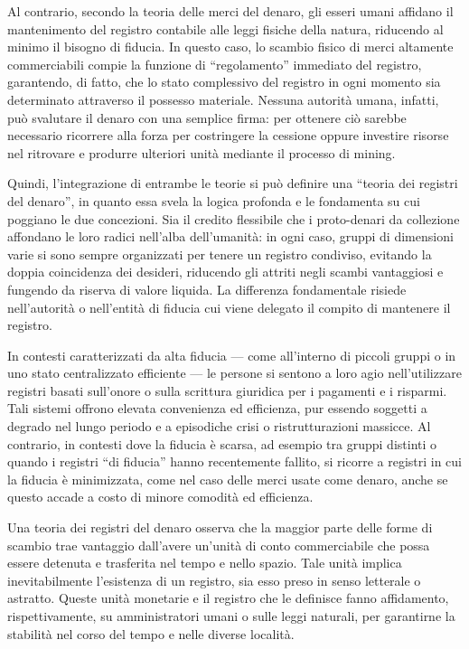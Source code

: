 \documentclass[
  a5paper,
  smalldemyvopaper,10pt,twoside,onecolumn,openright,extrafontsizes,hidelinks]{memoir}
\begin{document}
Al contrario, secondo la teoria delle merci del denaro, gli esseri umani
affidano il mantenimento del registro contabile alle leggi fisiche della
natura, riducendo al minimo il bisogno di fiducia. In questo caso, lo
scambio fisico di merci altamente commerciabili compie la funzione di
``regolamento'' immediato del registro, garantendo, di fatto, che lo
stato complessivo del registro in ogni momento sia determinato
attraverso il possesso materiale. Nessuna autorità umana, infatti, può
svalutare il denaro con una semplice firma: per ottenere ciò sarebbe
necessario ricorrere alla forza per costringere la cessione oppure
investire risorse nel ritrovare e produrre ulteriori unità mediante il
processo di mining.

Quindi, l'integrazione di entrambe le teorie si può definire una
``teoria dei registri del denaro'', in quanto essa svela la logica
profonda e le fondamenta su cui poggiano le due concezioni. Sia il
credito flessibile che i proto-denari da collezione affondano le loro
radici nell'alba dell'umanità: in ogni caso, gruppi di dimensioni varie
si sono sempre organizzati per tenere un registro condiviso, evitando la
doppia coincidenza dei desideri, riducendo gli attriti negli scambi
vantaggiosi e fungendo da riserva di valore liquida. La differenza
fondamentale risiede nell'autorità o nell'entità di fiducia cui viene
delegato il compito di mantenere il registro.

In contesti caratterizzati da alta fiducia --- come all'interno di
piccoli gruppi o in uno stato centralizzato efficiente --- le persone si
sentono a loro agio nell'utilizzare registri basati sull'onore o sulla
scrittura giuridica per i pagamenti e i risparmi. Tali sistemi offrono
elevata convenienza ed efficienza, pur essendo soggetti a degrado nel
lungo periodo e a episodiche crisi o ristrutturazioni massicce. Al
contrario, in contesti dove la fiducia è scarsa, ad esempio tra gruppi
distinti o quando i registri ``di fiducia'' hanno recentemente fallito,
si ricorre a registri in cui la fiducia è minimizzata, come nel caso
delle merci usate come denaro, anche se questo accade a costo di minore
comodità ed efficienza.

Una teoria dei registri del denaro osserva che la maggior parte delle
forme di scambio trae vantaggio dall'avere un'unità di conto
commerciabile che possa essere detenuta e trasferita nel tempo e nello
spazio. Tale unità implica inevitabilmente l'esistenza di un registro,
sia esso preso in senso letterale o astratto. Queste unità monetarie e
il registro che le definisce fanno affidamento, rispettivamente, su
amministratori umani o sulle leggi naturali, per garantirne la stabilità
nel corso del tempo e nelle diverse località.
\end{document}
